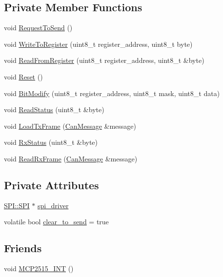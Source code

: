 \subsection*{Private Member Functions}
\begin{DoxyCompactItemize}
\item 
void \hyperlink{class_m_c_p2515_a5a218199ca1dfcb25cb95890bc0220fc}{Request\+To\+Send} ()
\item 
void \hyperlink{class_m_c_p2515_adbc005a5975b77b0aef74363f3832f9b}{Write\+To\+Register} (uint8\+\_\+t register\+\_\+address, uint8\+\_\+t byte)
\item 
void \hyperlink{class_m_c_p2515_a09ef6973daccbf868d89986e727cfa1b}{Read\+From\+Register} (uint8\+\_\+t register\+\_\+address, uint8\+\_\+t \&byte)
\item 
void \hyperlink{class_m_c_p2515_aa4d4138b984dc87116cf72ae104acb70}{Reset} ()
\item 
void \hyperlink{class_m_c_p2515_aa9a35fe139adf1fccaaceec561544c14}{Bit\+Modify} (uint8\+\_\+t register\+\_\+address, uint8\+\_\+t mask, uint8\+\_\+t data)
\item 
void \hyperlink{class_m_c_p2515_ae466f10eea5ccf0f36439757d4baf6b5}{Read\+Status} (uint8\+\_\+t \&byte)
\item 
void \hyperlink{class_m_c_p2515_a98ab4323b49fc629871584ce8f22a617}{Load\+Tx\+Frame} (\hyperlink{struct_can_message}{Can\+Message} \&message)
\item 
void \hyperlink{class_m_c_p2515_af6853f82074a0be19d5a0516a959515e}{Rx\+Status} (uint8\+\_\+t \&byte)
\item 
void \hyperlink{class_m_c_p2515_ae9c114f9fd7248d78fe5617648f7571b}{Read\+Rx\+Frame} (\hyperlink{struct_can_message}{Can\+Message} \&message)
\end{DoxyCompactItemize}
\subsection*{Private Attributes}
\begin{DoxyCompactItemize}
\item 
\hyperlink{class_s_p_i_1_1_s_p_i}{S\+P\+I\+::\+S\+PI} $\ast$ \hyperlink{class_m_c_p2515_a7c70cb397f4d2881a1878e40b9278ad0}{spi\+\_\+driver}
\item 
volatile bool \hyperlink{class_m_c_p2515_a1418f0f66d9a57659809192552d5ac37}{clear\+\_\+to\+\_\+send} = true
\end{DoxyCompactItemize}
\subsection*{Friends}
\begin{DoxyCompactItemize}
\item 
void \hyperlink{class_m_c_p2515_a3e97befdad3bb95f1da9cf6ff507febe}{M\+C\+P2515\+\_\+\+I\+NT} ()
\end{DoxyCompactItemize}
